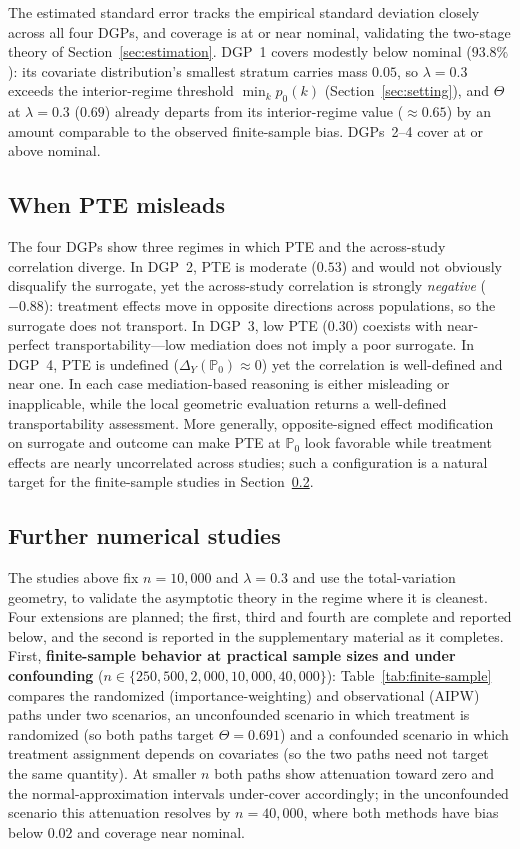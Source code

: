 \documentclass{article}
\newcommand{\PP}{\mathbb{P}}
\begin{document}
The estimated standard error tracks the empirical standard deviation closely
across all four DGPs, and coverage is at or near nominal, validating the
two-stage theory of Section~\ref{sec:estimation}. DGP~1 covers modestly below
nominal ($93.8\%$): its covariate distribution's smallest stratum carries mass
$0.05$, so $\lambda = 0.3$ exceeds the interior-regime threshold $\min_k
p_0(k)$ (Section~\ref{sec:setting}), and $\Theta$ at $\lambda = 0.3$ ($0.69$)
already departs from its interior-regime value ($\approx 0.65$) by an amount
comparable to the observed finite-sample bias. DGPs~2--4 cover at or above
nominal.

\subsection{When PTE misleads}\label{sec:pte-misleads}

The four DGPs show three regimes in which PTE and the across-study correlation
diverge. In DGP~2, PTE is moderate ($0.53$) and would not obviously disqualify the
surrogate, yet the across-study correlation is strongly \emph{negative} ($-0.88$):
treatment effects move in opposite directions across populations, so the surrogate
does not transport. In DGP~3, low PTE ($0.30$) coexists with near-perfect
transportability---low mediation does not imply a poor surrogate. In DGP~4, PTE is
undefined ($\Delta_Y(\PP_0) \approx 0$) yet the correlation is well-defined and
near one. In each case mediation-based reasoning is either misleading or
inapplicable, while the local geometric evaluation returns a well-defined
transportability assessment. More generally, opposite-signed effect modification
on surrogate and outcome can make PTE at $\PP_0$ look favorable while treatment
effects are nearly uncorrelated across studies; such a configuration is a natural
target for the finite-sample studies in Section~\ref{sec:sim-future}.

\subsection{Further numerical studies}\label{sec:sim-future}

The studies above fix $n = 10{,}000$ and $\lambda = 0.3$ and use the total-variation
geometry, to validate the asymptotic theory in the regime where it is cleanest.
Four extensions are planned; the first, third and fourth are complete and
reported below, and the second is reported in the supplementary material as it
completes. First,
\textbf{finite-sample behavior at practical sample sizes and under confounding}
($n \in \{250, 500, 2{,}000, 10{,}000, 40{,}000\}$): Table~\ref{tab:finite-sample}
compares the randomized (importance-weighting) and observational (AIPW) paths
under two scenarios, an unconfounded scenario in which treatment is randomized (so
both paths target $\Theta = 0.691$) and a confounded scenario in which treatment
assignment depends on covariates (so the two paths need not target the same
quantity). At smaller $n$ both paths show attenuation toward zero and the
normal-approximation intervals under-cover accordingly; in the unconfounded
scenario this attenuation resolves by $n = 40{,}000$, where both methods have bias
below $0.02$ and coverage near nominal.
\end{document}
